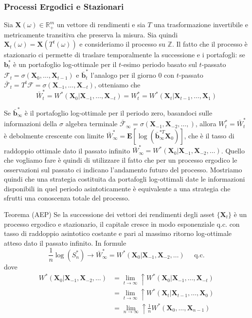 \documentclass{beamer}
\theoremstyle{plain}
\theoremstyle{definition}
\theoremstyle{remark}
\newcommand{\R}{\mathbb{R}}
\newcommand{\Z}{\mathbb{Z}}
\newcommand{\X}{\bm{X}}
\newcommand{\B}{\bm{b}}
\newcommand{\F}{\mathcal{F}}
\newcommand{\E}{\mathbf{E}}
\begin{document}
\begin{frame}[label=postAOP]
	\frametitle{Processi Ergodici e Stazionari}
	Sia $\X(\omega)\in \R_+^m$ un vettore di rendimenti e sia $T$ una trasformazione invertibile e metricamente transitiva che preserva la misura. Sia quindi $\X_t(\omega) = \X(T^t(\omega))$ e consideriamo il processo su $\Z$.\newline
	Il fatto che il processo è stazionario ci permette di traslare temporalmente la successione e i portafogli: se $\B_t^*$ è un portafoglio log-ottimale per il $t$-esimo periodo basato sul $t$-passato $\F_t=\sigma(\X_0,\ldots,\X_{t-1})$ e $\bar{\B}_t^*$ l'analogo per il giorno $0$ con $t$-passato $\bar{\F}_t=T^t\F= \sigma(\X_{-1},\ldots,\X_{-t})$, otteniamo che
	\begin{equation*}
	\bar{W}_t^{*}=W^*(\X_0|\X_{-1},\ldots, \X_{-t}) = W^*_t = W^*(\X_t|\X_{t-1},\ldots, \X_1)
	\end{equation*} 
\end{frame}
\begin{frame}
	Se $\bar{\B}_{\infty}^*$ è il portafoglio log-ottimale per il periodo zero, basandoci sulle informazioni della $\sigma$ algebra terminale $\bar{\F}_\infty=\sigma(\X_{-1},\X_{-2},\ldots,)$, allora $W^*_t=\bar{W}_t^*$ è debolmente crescente con limite $\bar{W}_\infty^*=\E[\log(\bar{\B}_\infty^{*T}\X_0)]$, che è il tasso di raddoppio ottimale dato il passato infinito $\bar{W}_\infty^{*}=W^*(\X_0|\X_{-1},\X_{-2},\ldots)$.
	\newline
	Quello che vogliamo fare è quindi di utilizzare il fatto che per un processo ergodico le osservazioni sul passato ci indicano l'andamento futuro del processo. Mostriamo quindi che una strategia costituita da portafogli log-ottimali date le informazioni disponibili in quel periodo asintoticamente è equivalente a una strategia che sfrutti una conoscenza totale del processo.
\end{frame}
\begin{frame}
	\begin{block}{Teorema (AEP)}
		Se la successione dei vettori dei rendimenti degli asset $\{\X_t\}$ è un processo ergodico e stazionario, il capitale cresce in modo esponenziale q.c. con tasso di raddoppio asintotico costante e pari al massimo ritorno log-ottimale atteso dato il passato infinito. In formule 
		\begin{equation*}
		\frac{1}{n}\log(S_n^*)\rightarrow \bar{W}_\infty^*=W^*(\X_0|\X_{-1},\X_{-2},\ldots) \;\;\;\;\; \text{q.c.}
		\end{equation*}
		dove
		\begin{equation*}
		\begin{split}
		W^*(\X_0|\X_{-1},\X_{-2},\ldots) & = \lim\limits_{t\to\infty}\uparrow W^*(\X_0|\X_{-1},\ldots,\X_{-t})\\
		& = \lim\limits_{t\to\infty}\uparrow W^*(\X_t|\X_{t-1},\ldots,\X_{0})\\
		& = \lim\limits_{n\to\infty}\uparrow \frac{1}{n}W^*(\X_0,\ldots,\X_{n-1})
		\end{split}
		\end{equation*}
	\end{block}
\hyperlink{postAEP}{}
\end{frame}
\end{document}
